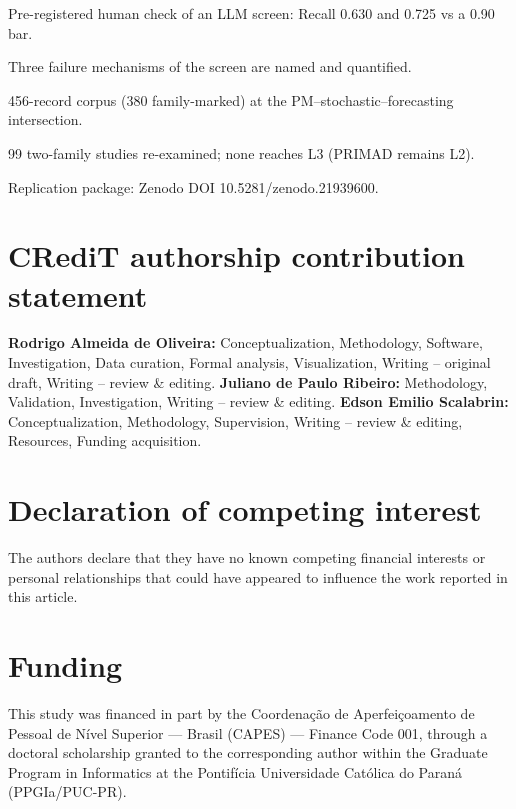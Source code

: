 \documentclass[review,3p,times]{elsarticle}
\begin{document}
\begin{frontmatter}
\begin{highlights}
\item Pre-registered human check of an LLM screen: Recall 0.630 and 0.725 vs a 0.90 bar.
\item Three failure mechanisms of the screen are named and quantified.
\item 456-record corpus (380 family-marked) at the PM--stochastic--forecasting intersection.
\item 99 two-family studies re-examined; none reaches L3 (PRIMAD remains L2).
\item Replication package: Zenodo DOI 10.5281/zenodo.21939600.
\end{highlights}

\end{frontmatter}



\section*{CRediT authorship contribution statement}
\textbf{Rodrigo Almeida de Oliveira:} Conceptualization, Methodology,
Software, Investigation, Data curation, Formal analysis, Visualization,
Writing -- original draft, Writing -- review \& editing.
\textbf{Juliano de Paulo Ribeiro:} Methodology, Validation, Investigation,
Writing -- review \& editing.
\textbf{Edson Emilio Scalabrin:} Conceptualization, Methodology,
Supervision, Writing -- review \& editing, Resources, Funding acquisition.

\section*{Declaration of competing interest}
The authors declare that they have no known competing financial interests
or personal relationships that could have appeared to influence the work
reported in this article.

\section*{Funding}
This study was financed in part by the Coordena\c c\~ao de Aperfei\c
coamento de Pessoal de N\'ivel Superior --- Brasil (CAPES) --- Finance
Code 001, through a doctoral scholarship granted to the corresponding
author within the Graduate Program in Informatics at the Pontif\'icia
Universidade Cat\'olica do Paran\'a (PPGIa/PUC-PR).
\end{document}
